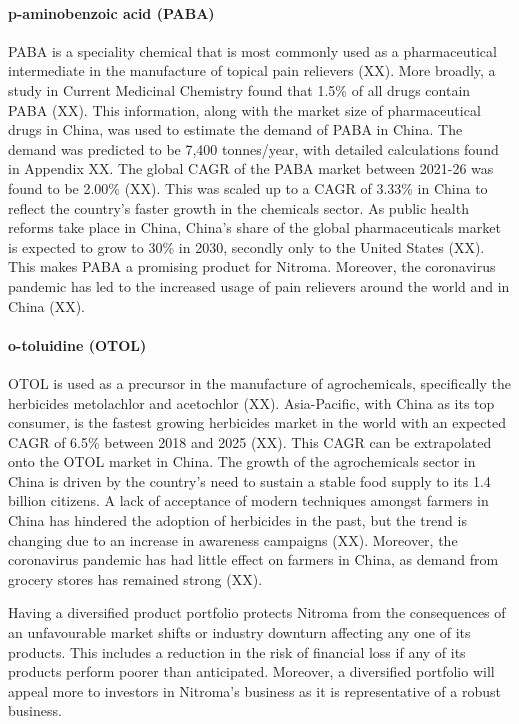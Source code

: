 \paragraph{p-aminobenzoic acid (PABA)}
PABA is a speciality chemical that is most commonly used as a pharmaceutical intermediate in the manufacture of topical pain relievers (XX). More broadly, a study in Current Medicinal Chemistry found that 1.5\% of all drugs contain PABA (XX). This information, along with the market size of pharmaceutical drugs in China, was used to estimate the demand of PABA in China. The demand was predicted to be 7,400 tonnes/year, with detailed calculations found in Appendix XX. The global CAGR of the PABA market between 2021-26 was found to be 2.00\% (XX). This was scaled up to a CAGR of 3.33\% in China to reflect the country’s faster growth in the chemicals sector. As public health reforms take place in China, China’s share of the global pharmaceuticals market is expected to grow to 30\% in 2030, secondly only to the United States (XX). This makes PABA a promising product for Nitroma. Moreover, the coronavirus pandemic has led to the increased usage of pain relievers around the world and in China (XX).

\paragraph{o-toluidine (OTOL)}
OTOL is used as a precursor in the manufacture of agrochemicals, specifically the herbicides metolachlor and acetochlor (XX). Asia-Pacific, with China as its top consumer, is the fastest growing herbicides market in the world with an expected CAGR of 6.5\% between 2018 and 2025 (XX). This CAGR can be extrapolated onto the OTOL market in China. The growth of the agrochemicals sector in China is driven by the country’s need to sustain a stable food supply to its 1.4 billion citizens. A lack of acceptance of modern techniques amongst farmers in China has hindered the adoption of herbicides in the past, but the trend is changing due to an increase in awareness campaigns (XX). Moreover, the coronavirus pandemic has had little effect on farmers in China, as demand from grocery stores has remained strong (XX).

Having a diversified product portfolio protects Nitroma from the consequences of an unfavourable market shifts or industry downturn affecting any one of its products. This includes a reduction in the risk of financial loss if any of its products perform poorer than anticipated. Moreover, a diversified portfolio will appeal more to investors in Nitroma’s business as it is representative of a robust business.